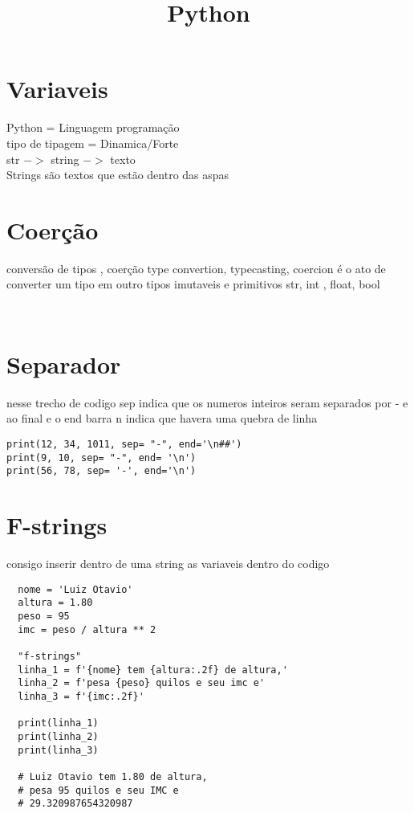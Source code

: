 \documentclass[a4paper, 16pt]{}
\date{} %
\title{Python}
\begin{document}
\maketitle
\section{Variaveis}
Python = Linguagem programação\\
tipo de tipagem = Dinamica/Forte\\
str $->$ string $->$ texto\\
Strings são textos que estão dentro das aspas


\section{Coerção}
conversão de tipos , coerção
type convertion, typecasting, coercion
é o ato de converter um tipo em outro
tipos imutaveis e primitivos
str, int , float, bool 

\begin{lstlisting}


\end{lstlisting}

\section{Separador}
nesse trecho de codigo  sep indica que os numeros inteiros seram separados
por - e ao final e o end barra n indica que havera uma quebra de linha
\begin{lstlisting}
print(12, 34, 1011, sep= "-", end='\n##')
print(9, 10, sep= "-", end= '\n')
print(56, 78, sep= '-', end='\n')
\end{lstlisting}

\section{F-strings}
consigo inserir dentro de uma string as variaveis dentro do codigo
\begin{lstlisting}
  nome = 'Luiz Otavio'
  altura = 1.80
  peso = 95
  imc = peso / altura ** 2
  
  "f-strings"
  linha_1 = f'{nome} tem {altura:.2f} de altura,'
  linha_2 = f'pesa {peso} quilos e seu imc e'
  linha_3 = f'{imc:.2f}'
  
  print(linha_1)
  print(linha_2)
  print(linha_3)
  
  # Luiz Otavio tem 1.80 de altura,
  # pesa 95 quilos e seu IMC e
  # 29.320987654320987
\end{lstlisting}  
\end{document}
